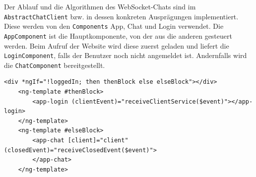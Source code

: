 \documentclass[11pt,a4paper,titlepage]{scrartcl}
\numberwithin{equation}{section}
\begin{document}
\noindent Der Ablauf und die Algorithmen des WebSocket-Chats sind im \texttt{AbstractChatClient} bzw. in dessen konkreten Ausprägungen implementiert. Diese werden von den \texttt{Components} App, Chat und Login verwendet. Die \texttt{AppComponent} ist die Hauptkomponente, von der aus die anderen gesteuert werden. Beim Aufruf der Website wird diese zuerst geladen und liefert die \texttt{LoginComponent}, falls der Benutzer noch nicht angemeldet ist. Andernfalls wird die \texttt{ChatComponent} bereitgestellt. \medskip

\begin{lstlisting}[frame=single, caption=WebSocket-Client: AppComponent-View, label=lst:wsClientRoot]
	<div *ngIf="!loggedIn; then thenBlock else elseBlock"></div>
	<ng-template #thenBlock>
		<app-login (clientEvent)="receiveClientService($event)"></app-login>
	</ng-template>
	<ng-template #elseBlock>
		<app-chat [client]="client" (closedEvent)="receiveClosedEvent($event)">
		</app-chat>
	</ng-template>
\end{lstlisting}
\end{document}
